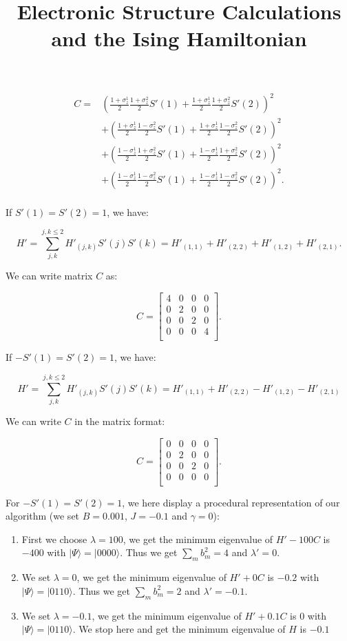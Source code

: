\documentclass{article}
\newcommand\z[1]{\sigma_z^{#1}}\title{Electronic Structure Calculations and the Ising Hamiltonian}
\begin{document}
\begin{equation}
\begin{aligned}
C=&(\frac{1+\z{1}}{2}\frac{1+\z{2}}{2}S'(1)+\frac{1+\z{1}}{2}\frac{1+\z{2}}{2}S'(2))^2\\
&+(\frac{1+\z{1}}{2}\frac{1-\z{2}}{2}S'(1)+\frac{1+\z{1}}{2}\frac{1-\z{2}}{2}S'(2))^2\\
&+(\frac{1-\z{1}}{2}\frac{1+\z{2}}{2}S'(1)+\frac{1-\z{1}}{2}\frac{1+\z{2}}{2}S'(2))^2\\
&+(\frac{1-\z{1}}{2}\frac{1-\z{2}}{2}S'(1)+\frac{1-\z{1}}{2}\frac{1-\z{2}}{2}S'(2))^2 .\\
\end{aligned}
\end{equation}

If $S'(1)=S'(2)=1$, we have:

\begin{equation}
H'=\sum_{j,k}^{j,k \leq 2} H'_{(j,k)}S'(j)S'(k)=H'_{(1,1)}+H'_{(2,2)}+H'_{(1,2)}+H'_{(2,1)} .
\end{equation}


We can write matrix $C$ as:

\[
C=
\begin{bmatrix}
4 & 0 & 0 & 0\\
0 & 2 & 0 & 0\\
0 & 0 & 2 & 0\\
0 & 0 & 0 & 4\\
\end{bmatrix} .
\]

If $-S'(1) =S'(2)=1$, we have:

\begin{equation}
H'=\sum_{j,k}^{j,k \leq 2} H'_{(j,k)}S'(j)S'(k)=H'_{(1,1)}+H'_{(2,2)}-H'_{(1,2)}-H'_{(2,1)}
\end{equation}


We can write $C$ in the matrix format:

\[
C=
\begin{bmatrix}
0 & 0 & 0 & 0\\
0 & 2 & 0 & 0\\
0 & 0 & 2 & 0\\
0 & 0 & 0 & 0\\
\end{bmatrix} .
\]

For $-S'(1)=S'(2)=1$, we here display a procedural representation of our algorithm (we set $B=0.001$, $J=-0.1$ and
$\gamma=0$):

\begin{enumerate}
\item First we choose $\lambda=100$, we get the minimum eigenvalue of $H'-100C$ is $-400$ with $|\Psi\rangle=|0000\rangle$. Thus we get $\sum_mb_m^2=4$ and $\lambda'=0$.

\item We set $\lambda=0$, we get the minimum eigenvalue of $H'+0C$ is $-0.2$ with $|\Psi\rangle=|0110\rangle$. Thus we get $\sum_mb_m^2=2$ and $\lambda'=-0.1$.

\item We set $\lambda=-0.1$, we get the minimum eigenvalue of $H'+0.1C$ is $0$ with $|\Psi\rangle=|0110\rangle$. We stop here and get the minimum eigenvalue of $H$ is $-0.1$
\end{enumerate}
\end{document}
